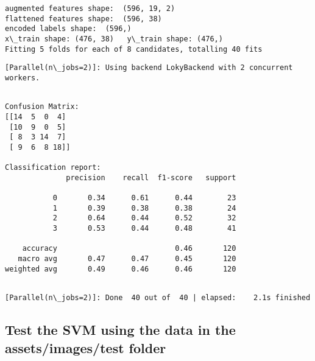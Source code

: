 \documentclass[11pt]{article}
\begin{document}
    \begin{Verbatim}[commandchars=\\\{\}]
augmented features shape:  (596, 19, 2)
flattened features shape:  (596, 38)
encoded labels shape:  (596,)
x\_train shape: (476, 38)	y\_train shape: (476,)
Fitting 5 folds for each of 8 candidates, totalling 40 fits

    \end{Verbatim}

    \begin{Verbatim}[commandchars=\\\{\}]
[Parallel(n\_jobs=2)]: Using backend LokyBackend with 2 concurrent workers.

    \end{Verbatim}

    \begin{Verbatim}[commandchars=\\\{\}]

Confusion Matrix:
[[14  5  0  4]
 [10  9  0  5]
 [ 8  3 14  7]
 [ 9  6  8 18]]

Classification report:
              precision    recall  f1-score   support

           0       0.34      0.61      0.44        23
           1       0.39      0.38      0.38        24
           2       0.64      0.44      0.52        32
           3       0.53      0.44      0.48        41

    accuracy                           0.46       120
   macro avg       0.47      0.47      0.45       120
weighted avg       0.49      0.46      0.46       120


    \end{Verbatim}

    \begin{Verbatim}[commandchars=\\\{\}]
[Parallel(n\_jobs=2)]: Done  40 out of  40 | elapsed:    2.1s finished

    \end{Verbatim}

    \subsection{Test the SVM using the data in the assets/images/test
folder}\label{test-the-svm-using-the-data-in-the-assetsimagestest-folder}
\end{document}
